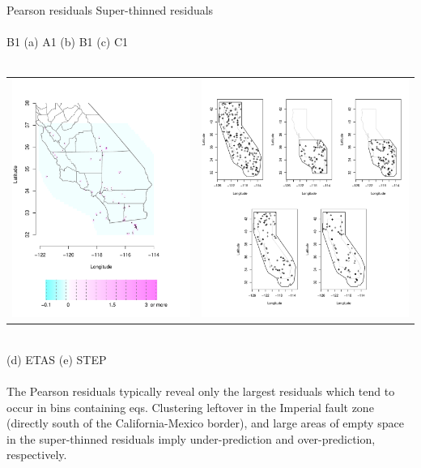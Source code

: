 \documentclass[landscape,a0paper,final,showframe]{baposter}
\begin{document}
\begin{poster}
{%
 \mbox{\hspace{2cm}} {\large Pearson residuals}\hspace{4cm} {\large Super-thinned residuals}\\
\vspace{-.3cm}\\
%
 \mbox{\hspace{3.3cm}} B1 \hspace{5.6cm} (a) A1 \hspace{.9cm}(b) B1 \hspace{.9cm}(c) C1 \\
 \vspace{-.8cm}\\
\begin{tabular}{cc}
	\hspace{1.2cm}  \includegraphics[height=.4\linewidth]{kaganxtPearsonnew.pdf}  & \hspace{2cm}
	\includegraphics[height=.4\linewidth]{allst.pdf}
\end{tabular}
\vspace{-.4cm}\\
\mbox{\hspace{10.2cm}} (d) ETAS \hspace{.4cm} (e) STEP\\
\vspace{-.3cm}\\
The Pearson residuals typically reveal only the largest residuals which tend to occur in bins containing eqs. Clustering leftover in the Imperial fault zone (directly south of the California-Mexico border), and large areas of empty space in the super-thinned residuals imply under-prediction and over-prediction, respectively.  
}
\end{poster}
\end{document}
